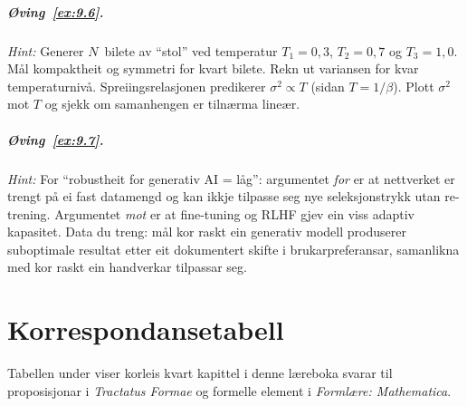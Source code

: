 \paragraph{Øving~\ref{ex:9.6}.}
\emph{Hint:} Generer $N$~bilete av ``stol'' ved temperatur
$T_1 = 0{,}3$, $T_2 = 0{,}7$ og $T_3 = 1{,}0$. Mål
kompaktheit og symmetri for kvart bilete. Rekn ut variansen for
kvar temperaturnivå. Spreiingsrelasjonen predikerer
$\sigma^2 \propto T$ (sidan $T = 1/\beta$). Plott
$\sigma^2$ mot $T$ og sjekk om samanhengen er tilnærma lineær.

\paragraph{Øving~\ref{ex:9.7}.}
\emph{Hint:} For ``robustheit for generativ AI = låg'': argumentet
\emph{for} er at nettverket er trengt på ei fast datamengd og kan
ikkje tilpasse seg nye seleksjonstrykk utan re-trening.
Argumentet \emph{mot} er at fine-tuning og RLHF gjev ein viss
adaptiv kapasitet. Data du treng: mål kor raskt ein
generativ modell produserer suboptimale resultat etter eit dokumentert
skifte i brukarpreferansar, samanlikna med kor raskt ein
handverkar tilpassar seg.



\appendix

\chapter{Korrespondansetabell}

Tabellen under viser korleis kvart kapittel i denne læreboka svarar
til proposisjonar i \textit{Tractatus Formae} og formelle element i
\textit{Forml\ae re: Mathematica}.

